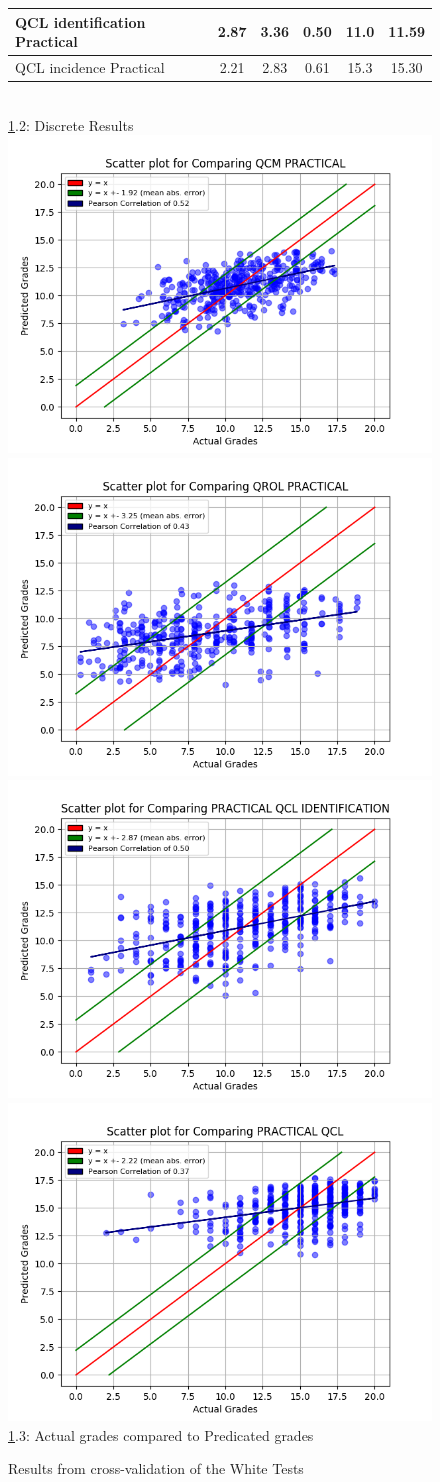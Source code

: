 \documentclass[a4paper,11pt]{report}
\numberwithin{figure}{chapter} %
\begin{document}
\begin{figure}[H]
\begin{tabular}{| l | c | c | c | c | c |}
      \tiny{QCL identification Practical} & \tiny{2.87} & \tiny{3.36} & \tiny{0.50} & \tiny{11.0} & \tiny{11.59}\\ \hline
      \tiny{QCL incidence Practical} & \tiny{2.21} & \tiny{2.83} & \tiny{0.61} & \tiny{15.3} & \tiny{15.30}\\
      \hline
      \end{tabular}\\
      \vspace{0.5cm}
      \ref{fig:results_prac}.2: Discrete Results\\
      \vspace{0.3cm}
      \includegraphics[width=.30\linewidth]{plots/cv_comp_QCM_PRACTICAL_2018-04-27_19_12_27.png}
      \includegraphics[width=.30\linewidth]{plots/cv_comp_QROL_PRACTICAL_2018-04-27_19_11_08.png}\\
      \includegraphics[width=.30\linewidth]{plots/cv_comp_PRACTICAL_QCL_IDENTIFICATION_2018-04-27_16_59_01.png}
  	  \includegraphics[width=.30\linewidth]{plots/cv_comp_PRACTICAL_QCL_2018-04-27_17_10_02.png}
      \\
      \ref{fig:results_prac}.3: Actual grades compared to Predicated grades
      \caption{Results from cross-validation of the White Tests}
      \label{fig:results_prac}
    \end{figure}
\end{document}
